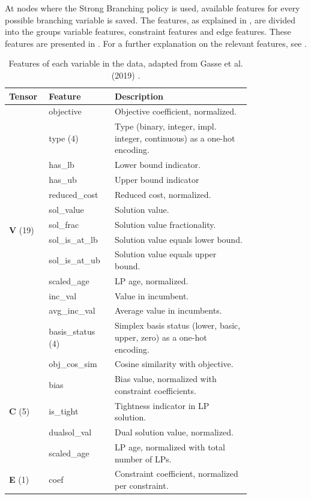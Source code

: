 At nodes where the Strong Branching policy is used, available features for every possible branching variable is saved. The features, as explained in , are divided into the groups variable features, constraint features and edge features. These features are presented in 
 . For a further explanation on the relevant features, see .
%
\renewcommand{\arraystretch}{1.5}
\begin{table}
	\centering
	\begin{tabular}{p{0.1\linewidth}p{0.2\linewidth}p{0.5\linewidth}}%
		\toprule
		  \textbf{Tensor} & \textbf{Feature} & \textbf{Description} \\ 
		  \toprule
		  \multirow{13}{*}{\textbf{V} (19)} & objective & Objective coefficient, normalized.  \\
		  & type (4) & Type (binary, integer, impl. integer, continuous) as a one-hot encoding. \\
		  & has\_lb & Lower bound indicator. \\
		  & has\_ub & Upper bound indicator \\
		  & reduced\_cost & Reduced cost, normalized. \\
		  & sol\_value & Solution value. \\
          & sol\_frac  & Solution value fractionality.\\
		  & sol\_is\_at\_lb & Solution value equals lower bound.\\
		  & sol\_is\_at\_ub & Solution value equals upper bound.\\
		  & scaled\_age & LP age, normalized. \\
          & inc\_val & Value in incumbent.\\
          & avg\_inc\_val & Average value in incumbents.\\
		  & basis\_status (4) & Simplex basis status (lower, basic, upper, zero) as a one-hot encoding.\\
		  \midrule
		  \multirow{5}{*}{\textbf{C} (5)} & obj\_cos\_sim & Cosine similarity with objective. \\
		  & bias & Bias value, normalized with constraint coefficients. \\
		  & is\_tight & Tightness indicator in LP solution. \\
		  & dualsol\_val & Dual solution value, normalized. \\
		  & scaled\_age & LP age, normalized with total number of LPs. \\
		  \midrule
		  \multirow{1}{*}{\textbf{E} (1)} & coef & Constraint coefficient, normalized per constraint. \\
		\bottomrule
	\end{tabular}
	\caption{Features of each variable in the data, adapted from Gasse et al. (2019) \cite{gasse2019exact}.}\label{tab:feats}
\end{table}
